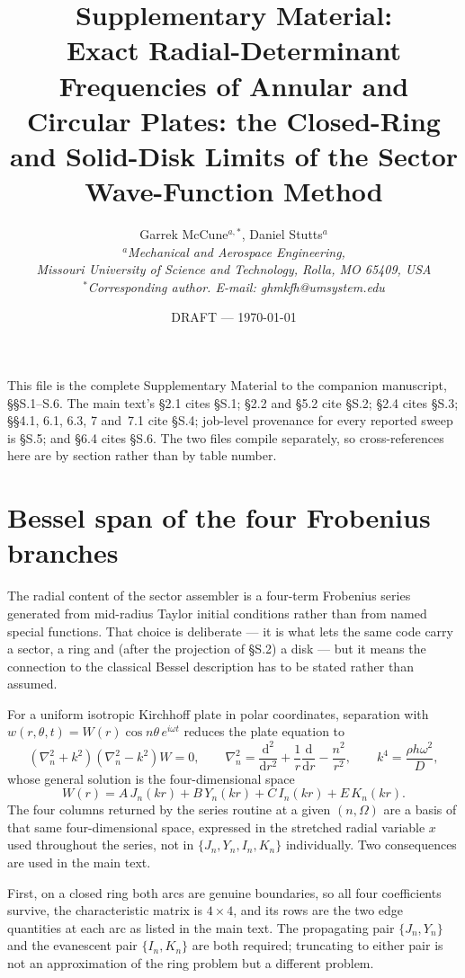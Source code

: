 \documentclass[11pt]{article}
\title{\bfseries Supplementary Material:\\
Exact Radial-Determinant Frequencies of Annular and Circular Plates:
the Closed-Ring and Solid-Disk Limits of the Sector Wave-Function Method}
\author{Garrek McCune$^{a,*}$, Daniel Stutts$^{a}$\\
\small\itshape $^a$Mechanical and Aerospace Engineering,\\
Missouri University of Science and Technology, Rolla, MO 65409, USA\\
\small\upshape $^*$Corresponding author. E-mail: ghmkfh@umsystem.edu}
\date{DRAFT --- \today}
\begin{document}
\maketitle

\noindent
This file is the complete Supplementary Material to the companion
manuscript, \S\S{}S.1--S.6. The main text's \S2.1 cites \S{}S.1; \S2.2 and
\S5.2 cite \S{}S.2; \S2.4 cites \S{}S.3; \S\S4.1, 6.1, 6.3, 7 and~7.1
cite \S{}S.4; job-level provenance for every reported sweep is \S{}S.5; and
\S6.4 cites \S{}S.6. The two files compile separately, so cross-references
here are by section rather than by table number.

\section{Bessel span of the four Frobenius branches}\label{sec:sm-bessel}
The radial content of the sector assembler is a four-term Frobenius series
generated from mid-radius Taylor initial conditions rather than from named
special functions. That choice is deliberate --- it is what lets the same code
carry a sector, a ring and (after the projection of \S{}S.2) a disk --- but it
means the connection to the classical Bessel description has to be stated
rather than assumed.

For a uniform isotropic Kirchhoff plate in polar coordinates, separation with
$w(r,\theta,t)=W(r)\cos n\theta\,e^{i\omega t}$ reduces the plate equation to
\begin{equation}
\left(\nabla_n^{2}+k^{2}\right)\left(\nabla_n^{2}-k^{2}\right)W=0,
\qquad
\nabla_n^{2}=\frac{\mathrm{d}^{2}}{\mathrm{d}r^{2}}
+\frac{1}{r}\frac{\mathrm{d}}{\mathrm{d}r}-\frac{n^{2}}{r^{2}},
\qquad
k^{4}=\frac{\rho h\omega^{2}}{D},
\label{eq:sm-factored}
\end{equation}
whose general solution is the four-dimensional space
\begin{equation}
W(r)=A\,J_n(kr)+B\,Y_n(kr)+C\,I_n(kr)+E\,K_n(kr).
\label{eq:sm-span}
\end{equation}
The four columns returned by the series routine at a given $(n,\Omega)$ are a
basis of that same four-dimensional space, expressed in the stretched radial
variable $x$ used throughout the series, not in $\{J_n,Y_n,I_n,K_n\}$
individually. Two consequences are used in the main text.

First, on a closed ring both arcs are genuine boundaries, so all four
coefficients survive, the characteristic matrix is $4\times4$, and its rows
are the two edge quantities at each arc as listed in the main text. The
propagating pair $\{J_n,Y_n\}$ and the evanescent pair $\{I_n,K_n\}$ are both
required; truncating to either pair is not an approximation of the ring
problem but a different problem.
\end{document}
